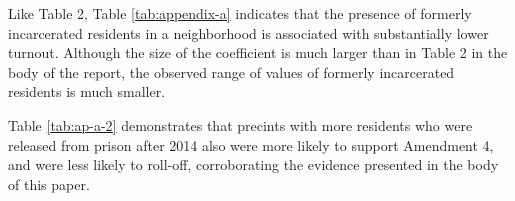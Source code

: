 \documentclass[
  12pt,
]{article}
\begin{document}
\begin{singlespace}


\end{singlespace}

Like Table 2, Table \ref{tab:appendix-a} indicates that the presence of formerly incarcerated residents in a neighborhood is associated with substantially lower turnout. Although the size of the coefficient is much larger than in Table 2 in the body of the report, the observed range of values of formerly incarcerated residents is much smaller.

Table \ref{tab:ap-a-2} demonstrates that precints with more residents who were released from prison after 2014 also were more likely to support Amendment 4, and were less likely to roll-off, corroborating the evidence presented in the body of this paper.

\begin{singlespace}


\end{singlespace}
\end{document}
